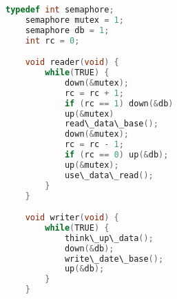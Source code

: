 \documentclass{article}
\begin{document}
    \begin{lstlisting}[language=C]
    typedef int semaphore;
    semaphore mutex = 1;
    semaphore db = 1;
    int rc = 0;

    void reader(void) {
        while(TRUE) {
            down(&mutex);
            rc = rc + 1;
            if (rc == 1) down(&db)
            up(&mutex)
            read\_data\_base();
            down(&mutex);
            rc = rc - 1;
            if (rc == 0) up(&db);
            up(&mutex);
            use\_data\_read();
        }
    }

    void writer(void) {
        while(TRUE) {
            think\_up\_data();
            down(&db);
            write\_date\_base();
            up(&db);
        }
    }
    \end{lstlisting}
\end{document}
